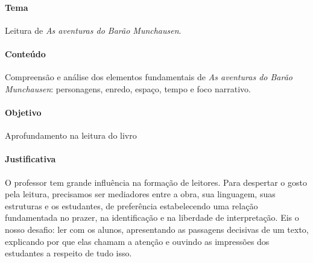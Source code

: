 \documentclass[11pt]{extarticle}
\begin{document}

\paragraph{Tema} Leitura de \textit{As aventuras do Barão Munchausen}.  

\paragraph{Conteúdo} Compreensão e análise dos elementos fundamentais de \textit{As aventuras do Barão Munchausen}: personagens, enredo, espaço, tempo e foco narrativo.  

\paragraph{Objetivo} Aprofundamento na leitura do livro  

\paragraph{Justificativa} O professor tem grande influência na formação de leitores. Para despertar o gosto pela leitura, precisamos ser mediadores entre a obra, sua linguagem, suas estruturas e os estudantes, de preferência estabelecendo uma relação fundamentada no prazer, na identificação e na liberdade de interpretação. Eis o nosso desafio: ler com os alunos, apresentando as passagens decisivas de um texto, explicando por que elas chamam a atenção e  ouvindo as impressões dos estudantes a respeito de tudo isso. 
\end{document}

